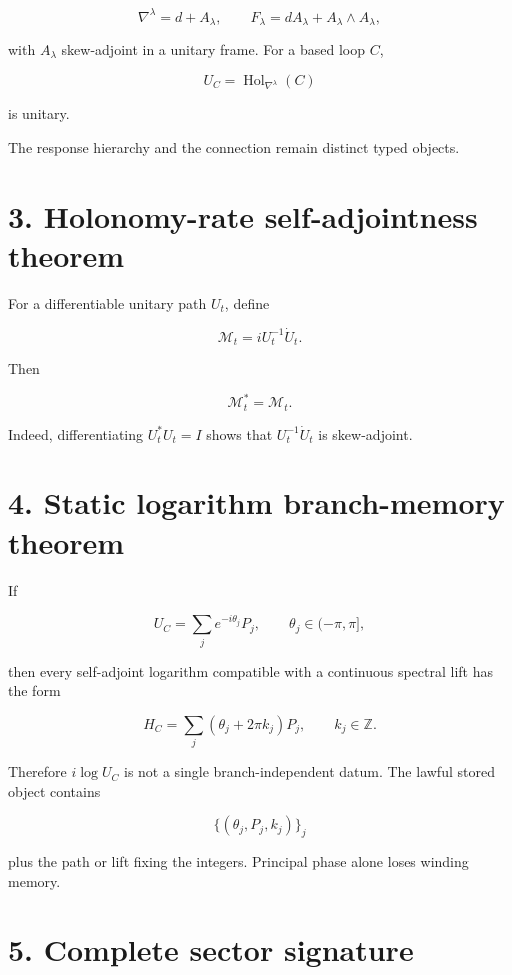\[
\nabla^\lambda=d+A_\lambda,
\qquad
F_\lambda=dA_\lambda+A_\lambda\wedge A_\lambda,
\]

with \(A_\lambda\) skew-adjoint in a unitary frame. For a based loop \(C\),

\[
U_C=\operatorname{Hol}_{\nabla^\lambda}(C)
\]

is unitary.

The response hierarchy and the connection remain distinct typed objects.

\hypertarget{holonomy-rate-self-adjointness-theorem}{%
\section{3. Holonomy-rate self-adjointness theorem}\label{holonomy-rate-self-adjointness-theorem}}

For a differentiable unitary path \(U_t\), define

\[
\mathcal M_t=iU_t^{-1}\dot U_t.
\]

Then

\[
\boxed{\mathcal M_t^*=\mathcal M_t.}
\]

Indeed, differentiating \(U_t^*U_t=I\) shows that \(U_t^{-1}\dot U_t\) is skew-adjoint.

\hypertarget{static-logarithm-branch-memory-theorem}{%
\section{4. Static logarithm branch-memory theorem}\label{static-logarithm-branch-memory-theorem}}

If

\[
U_C=\sum_j e^{-i\theta_j}P_j,
\qquad \theta_j\in(-\pi,\pi],
\]

then every self-adjoint logarithm compatible with a continuous spectral lift has the form

\[
H_C=\sum_j(\theta_j+2\pi k_j)P_j,
\qquad k_j\in\mathbb Z.
\]

Therefore \(i\log U_C\) is not a single branch-independent datum. The lawful stored object contains

\[
\{(\theta_j,P_j,k_j)\}_j
\]

plus the path or lift fixing the integers. Principal phase alone loses winding memory.

\hypertarget{complete-sector-signature}{%
\section{5. Complete sector signature}\label{complete-sector-signature}}

